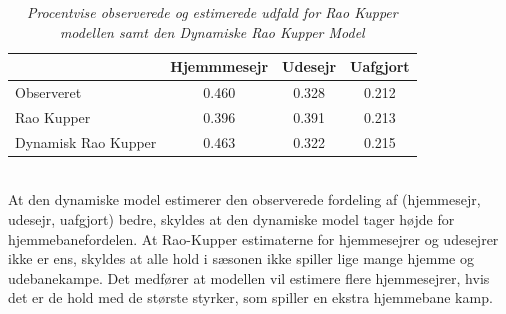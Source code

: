 \documentclass[11pt,a4paper]{article}
\begin{document}
\begin{table}[htb!]
\centering
\begin{adjustbox}{max width=\textwidth}
\begin{tabular}{|l|ccc|}
\hline 
 & Hjemmmesejr & Udesejr & Uafgjort \\
 \hline
Observeret & 0.460 & 0.328 & 0.212\\
Rao Kupper & 0.396 & 0.391 & 0.213\\
Dynamisk Rao Kupper & 0.463 & 0.322 & 0.215\\
   \hline   
\end{tabular} 
\end{adjustbox}
\caption{\label{tab:Styrkeestimater}\textit{Procentvise observerede og estimerede udfald for Rao Kupper modellen samt den Dynamiske Rao Kupper Model}}
\end{table}\\
At den dynamiske model estimerer den observerede fordeling af (hjemmesejr, udesejr, uafgjort) bedre, skyldes at den dynamiske model tager højde for hjemmebanefordelen. At Rao-Kupper estimaterne for hjemmesejrer og udesejrer ikke er ens, skyldes at alle hold i sæsonen ikke spiller lige mange hjemme og udebanekampe. Det medfører at modellen vil estimere flere hjemmesejrer, hvis det er de hold med de største styrker, som spiller en ekstra hjemmebane kamp. 
\end{document}
